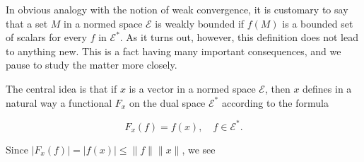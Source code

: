 In obvious analogy with the notion of weak convergence, it is customary to say that a set $M$ in a normed space $\mathcal{E}$ is weakly bounded if $f(M)$ is a bounded set of scalars for every $f$ in $\mathcal{E}^*$. As it turns out, however, this definition does not lead to anything new. This is a fact having many important consequences, and we pause to study the matter more closely.

The central idea is that if $x$ is a vector in a normed space $\mathcal{E}$, then $x$ defines in a natural way a functional $F_x$ on the dual space $\mathcal{E}^*$ according to the formula

$$F_x(f) = f(x), \quad f \in \mathcal{E}^*.$$

Since $|F_x(f)| = |f(x)| \leq \|f\| \|x\|$, we see
